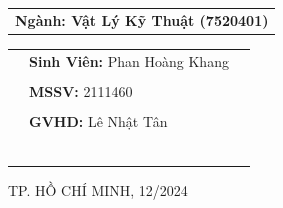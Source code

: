 \documentclass[13pt,a4paper,font=cm]{report}
\theoremstyle{definition}
\begin{document}
\begin{titlepage}
\begin{center}
\begin{tabular}{c}
\\ \vspace{0.5cm} {\textbf{{\LARGE Ngành: Vật Lý Kỹ Thuật (7520401)}}}
\end{tabular}
\end{center}
\begin{table}[h]
\begin{tabular}{rll}
\hspace{6 cm} &  \textbf{\Large Sinh Viên:} {\Large Phan Hoàng Khang}
\\
\\
\hspace{6 cm} &   \textbf{\Large MSSV:} {\Large 2111460 }
\\
\\
\hspace{6 cm}  & \textbf{\Large GVHD:} {\Large Lê Nhật Tân }\\
\\
\\
\\
\\
\\
\\
\end{tabular}
\end{table}
\vspace{0.5cm}
\begin{center}
{\Large TP. HỒ CHÍ MINH, 12/2024 }
\end{center}
\end{titlepage}
\thispagestyle{empty}
\renewcommand{\listalgorithmname}{Danh sách mã giả}
\newpage
\end{document}
